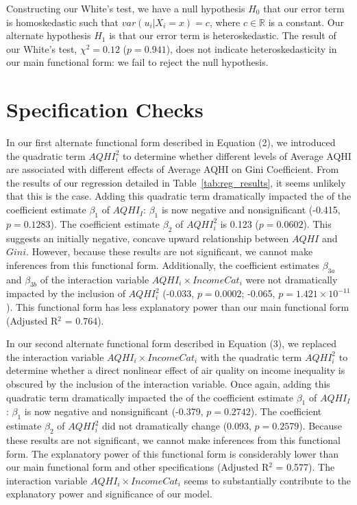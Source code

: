 \documentclass[AEJ]{AEA}
\begin{document}
Constructing our White's test, we have a null hypothesis $H_0$ that our error term is
homoskedastic such that $var \left(u_i | X_i = x \right) = c$, where $c \in \mathbb{R}$ is a constant.
Our alternate hypothesis $H_1$ is that our error term is heteroskedastic.
The result of our White's test, $\chi^2 = 0.12$ ($p=0.941$), does not indicate heteroskedasticity in our main functional form:
we fail to reject the null hypothesis.

\section{Specification Checks}

In our first alternate functional form described in Equation (2), we introduced the quadratic
term $AQHI^2_i$ to determine whether different levels of Average AQHI are
associated with different effects of Average AQHI on Gini Coefficient. From the
results of our regression detailed in Table~\ref{tab:reg_results}, it seems unlikely
that this is the case. Adding this quadratic term dramatically impacted the of the coefficient
estimate $\beta_1$ of $AQHI_I$: $\beta_1$ is now negative and nonsignificant (-0.415, $p=0.1283$).
The coefficient estimate $\beta_2$ of $AQHI^2_i$ is 0.123 ($p = 0.0602$). This suggests an initially negative,
concave upward relationship between $AQHI$ and $Gini$. However, because these results are not significant,
we cannot make inferences from this functional form. Additionally, the coefficient estimates
$\beta_{3a}$ and $\beta_{3b}$ of the interaction variable $AQHI_i \times IncomeCat_i$ were not dramatically
impacted by the inclusion of $AQHI^2_i$ (-0.033, $p = 0.0002$; -0.065, $p = 1.421\times 10^{-11}$). 
This functional form has less explanatory power than our main functional form (Adjusted R$^2$ = 0.764).


In our second alternate functional form described in Equation (3), we replaced the
interaction variable $AQHI_i\times IncomeCat_i$ with the quadratic term $AQHI^2_i$
to determine whether a direct nonlinear effect of air quality on income inequality
is obscured by the inclusion of the interaction variable. Once again, adding
this quadratic term dramatically impacted the of the coefficient
estimate $\beta_1$ of $AQHI_I$: $\beta_1$ is now negative and nonsignificant (-0.379, $p=0.2742$).
The coefficient estimate $\beta_2$ of $AQHI^2_i$ did not dramatically change (0.093, $p = 0.2579$).
Because these results are not significant, we cannot make inferences from this functional form.
The explanatory power of this functional form is considerably lower than our main functional form and
other specifications (Adjusted R$^2$ = 0.577). The interaction variable $AQHI_i \times IncomeCat_i$
seems to substantially contribute to the explanatory power and significance of our model.
\end{document}
